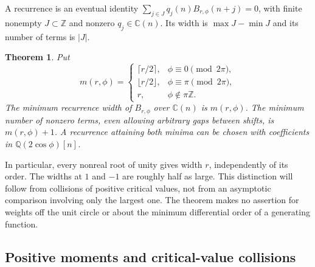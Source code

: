 \documentclass[11pt,a4paper]{article}
\newtheorem{theorem}{Theorem}[section]
\theoremstyle{definition}
\theoremstyle{remark}
\numberwithin{equation}{section}
\begin{document}
A recurrence is an eventual identity
$\sum_{j\in J}q_j(n)B_{r,\phi}(n+j)=0$, with finite nonempty
$J\subset\mathbb Z$ and nonzero $q_j\in\mathbb C(n)$.
Its width is $\max J-\min J$ and its number of terms is $|J|$.

\begin{theorem}\label{p3:thm:phase-classification}
Put
\begin{equation}\label{p3:eq:phase-width}
 m(r,\phi)=
 \begin{cases}
  \lceil r/2\rceil,&\phi\equiv0\pmod{2\pi},\\
  \lfloor r/2\rfloor,&\phi\equiv\pi\pmod{2\pi},\\
  r,&\phi\notin\pi\mathbb Z.
 \end{cases}
\end{equation}
The minimum recurrence width of $B_{r,\phi}$ over $\mathbb C(n)$ is
$m(r,\phi)$. The minimum number of nonzero terms, even allowing
arbitrary gaps between shifts, is $m(r,\phi)+1$.
A recurrence attaining both minima can be chosen with coefficients
in $\mathbb Q(2\cos\phi)[n]$.
\end{theorem}

In particular, every nonreal root of unity gives width $r$, independently
of its order. The widths at $1$ and $-1$ are roughly half as large.
This distinction will follow from collisions of positive critical
values, not from an asymptotic comparison involving only the largest
one. The theorem makes no assertion for weights off the unit circle
or about the minimum differential order of a generating function.

\subsection{Positive moments and critical-value collisions}
\end{document}
